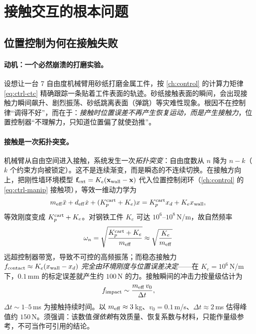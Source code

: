 \section{接触交互的根本问题}
\label{sec:os-contact-problem}

\subsection{位置控制为何在接触失败}
\label{sec:os-poscontrol-fail}

\paragraph{动机：一个必然崩溃的打磨实验。}
设想让一台 7 自由度机械臂用砂纸打磨金属工件，按 \cref{ch:control} 的计算力矩律 \cref{eq:ctrl-ctc} 精确跟踪一条贴着工件表面的轨迹。砂纸接触表面的瞬间，会出现接触力瞬间飙升、剧烈振荡、砂纸跳离表面（弹跳）等灾难性现象。根因不在控制律“调得不好”，而在于：\emph{接触时位置误差不再产生恢复运动，而是产生接触力}，位置控制器“不理解力，只知道位置偏了就使劲推”。

\paragraph{接触是一次拓扑突变。}
机械臂从自由空间进入接触，系统发生一次\emph{拓扑突变}：自由度数从 $n$ 降为 $n-k$（$k$ 个约束方向被锁定）。这不是连续渐变，而是瞬态的不连续切换。在接触方向上，把刚性墙环境模型 $\mathbf f_{\rm ext}=K_e(\mathbf x_{\rm wall}-\mathbf x)$ 代入位置控制闭环（\cref{ch:control} 的 \cref{eq:ctrl-manip} 接触项），等效一维动力学为
\begin{equation}
  m_{\rm eff}\ddot x+d_{\rm eff}\dot x+(K_p^{\rm cart}+K_e)x=K_p^{\rm cart}x_d+K_e x_{\rm wall},
  \label{eq:os-contact-stiffness}
\end{equation}
等效刚度变成 $K_p^{\rm cart}+K_e$。对钢铁工件 $K_e$ 可达 $10^6$--$10^8\,$N/m，故自然频率
\begin{equation}
  \omega_n=\sqrt{\frac{K_p^{\rm cart}+K_e}{m_{\rm eff}}}\approx\sqrt{\frac{K_e}{m_{\rm eff}}}
  \label{eq:os-contact-freq}
\end{equation}
远超控制器带宽，导致不可控的高频振荡；而稳态接触力 $f_{\rm contact}\approx K_e(x_{\rm wall}-x_d)$ \emph{完全由环境刚度与位置误差决定}——在 $K_e=10^6\,$N/m 下，$0.1\,$mm 的标定误差就产生约 $100\,$N 的力。接触瞬间的冲击力按量级估计为
\begin{equation}
  f_{\rm impact}\sim\frac{m_{\rm eff}\,v_0}{\Delta t},
  \label{eq:os-impact}
\end{equation}
$\Delta t\sim1$--$5\,$ms 为接触持续时间。以 $m_{\rm eff}\approx3\,$kg、$v_0=0.1\,$m/s、$\Delta t\approx2\,$ms 估得峰值约 $150\,$N。须强调：该数值\emph{强依赖}有效质量、恢复系数与材料，只能作量级参考，不可当作可引用的结论。

